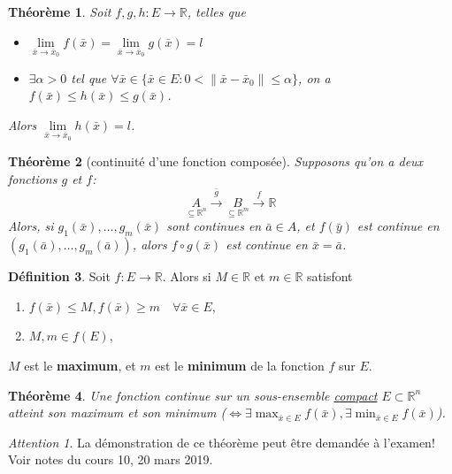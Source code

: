 \documentclass{report}
\theoremstyle{plain}
\newtheorem{thm}{Théorème}[chapter]
\theoremstyle{definition}
\newtheorem{defn}[thm]{Définition}
\theoremstyle{remark}
\newtheorem*{attention}{Attention}
\newcommand*{\norm}[1]{\lVert#1\rVert}
\begin{document}
\begin{thm}
	Soit $f, g, h : E \to \mathbb R$, telles que
	\begin{itemize}
		\item $\lim\limits_{\bar x \to \bar x_0} f(\bar x) = \lim\limits_{\bar x \to \bar x_0} g(\bar x) = l$
		\item $\exists \alpha > 0$ tel que $\forall \bar x \in \{\bar x \in E : 0 < \norm{\bar x - \bar x_0} \leq \alpha\}$, on a $f(\bar x) \leq h(\bar x) \leq g(\bar x)$.
	\end{itemize}
	Alors $\lim\limits_{\bar x \to \bar x_0} h(\bar x) = l$.
\end{thm}

\begin{thm}[continuité d'une fonction composée] Supposons qu'on a deux fonctions $g$ et $f$:
	\begin{equation*}
		\underset{\subseteq \mathbb R^n}{A} \overset{\bar g}{\longrightarrow} \underset{\subseteq \mathbb R^m}{B} \overset{f}{\longrightarrow} \mathbb R
	\end{equation*}
	Alors, si $g_1(\bar x), \ldots, g_m(\bar x)$ sont continues en $\bar a \in A$, et $f(\bar y)$ est continue en $(g_1(\bar a), \ldots, g_m(\bar a))$, alors $f \circ g(\bar x)$ est continue en $\bar x = \bar a$.
\end{thm}

\begin{defn}
	Soit $f : E \to \mathbb R$. Alors si $M \in \mathbb R$ et $m \in \mathbb R$ satisfont
	\begin{enumerate}
		\item $f(\bar x) \leq M, f(\bar x) \geq m \quad \forall \bar x \in E$,
		\item $M, m \in f(E)$,
	\end{enumerate}
	$M$ est le \textbf{maximum}, et $m$ est le \textbf{minimum} de la fonction $f$ sur $E$.
\end{defn}

\begin{thm}
	Une fonction continue sur un sous-ensemble \underline{compact} $E \subset \mathbb R^n$ atteint son maximum et son minimum ($\iff \exists \max_{\bar x \in E} f(\bar x), \exists \min_{\bar x \in E} f(\bar x)$).
\end{thm}
\begin{attention}
	La démonstration de ce théorème peut être demandée à l'examen! Voir notes du cours 10, 20 mars 2019.
\end{attention}
\end{document}
